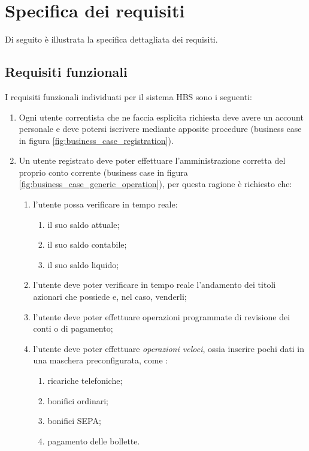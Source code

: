 
\section{Specifica dei requisiti}

Di seguito \`e illustrata la specifica dettagliata dei requisiti.

\subsection{Requisiti funzionali}

I requisiti funzionali individuati per il sistema HBS sono i seguenti:

\begin{enumerate}
	\item Ogni utente correntista che ne faccia esplicita richiesta deve avere un account personale e deve potersi iscrivere  mediante apposite procedure (business case in figura \ref{fig:business_case_registration}).
	\item Un utente registrato deve poter effettuare l'amministrazione corretta del proprio conto corrente (business case in figura \ref{fig:business_case_generic_operation}), per questa ragione è richiesto che:
	\begin{enumerate}
		\item l'utente possa verificare in tempo reale:
			\begin{enumerate}
				\item il suo saldo attuale;
				\item il suo saldo contabile;
				\item il suo saldo liquido;
			\end{enumerate} 
		\item l'utente deve poter verificare in tempo reale l'andamento dei titoli azionari che possiede e, nel caso, venderli;
		\item l'utente deve poter effettuare operazioni programmate di revisione dei conti o di pagamento;
		\item l'utente deve poter effettuare \emph{operazioni veloci}, ossia inserire pochi dati in una maschera preconfigurata, come :
			\begin{enumerate}
				\item ricariche telefoniche;
				\item bonifici ordinari;
				\item bonifici SEPA;
				\item pagamento delle bollette.
			\end{enumerate} 

\end{enumerate}
\end{enumerate}

